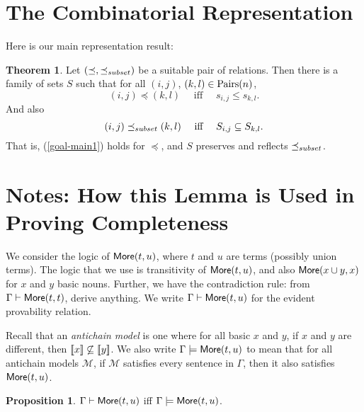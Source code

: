 \documentclass[12pt]{article}
\theoremstyle{definition}
\newtheorem{theorem}{Theorem}
\newtheorem{proposition}{Proposition}
\newcommand{\semantics}[1]{[\![\mbox{\em $ #1 $\/}]\!]}
\newcommand{\Model}{\mathcal{M}}
\newcommand{\proves}{\vdash}
\newcommand{\quadiff}{\quad \mbox{ iff } \quad}
\begin{document}
\section{The Combinatorial Representation}
Here is our main representation result:

\begin{theorem}
Let $(\preceq, \preceq_{\scriptsize subset})$ be a suitable pair of relations.
Then there is a family of sets $S$
such that for all $(i,j)$, $(k,l)\in\mbox{Pairs}(n)$,
\begin{equation}
    \label{goal-main1}
 (i,j) \preceq  (k,l) \quadiff 
 s_{i,j}\leq s_{k,l}.
 \end{equation}
 And also
 \begin{equation}
    \label{goal-main2}
 (i,j) \precsubseteq  (k,l) \quadiff 
S_{i,j}\subseteq S_{k,l}.
 \end{equation}
 That is, (\ref{goal-main1}) holds for $\preceq$, and $S$ preserves and reflects $\preceq_{\scriptsize subset}$.
 \label{theorem-thoughts-subset}
 \end{theorem}
 
 
\section{Notes: How this Lemma is Used in Proving Completeness}

\newcommand{\more}{\mbox{\sf More}}

We consider the logic of $\more(t,u)$, where $t$ and $u$ are terms (possibly union terms).
The logic that we use is transitivity of $\more(t,u)$, and also $\more(x\cup y, x)$ for $x$ and $y$
basic nouns.  Further, we have the contradiction rule:
from $\Gamma\proves\more(t,t)$, derive anything.
We write $\Gamma\proves\more(t,u)$
for the evident provability relation.  

Recall that an \emph{antichain model} is one where for all basic $x$ and $y$, if $x$ and $y$ are different,
then $\semantics{x} \not\subseteq \semantics{y}$.
We also write $\Gamma\models\more(t,u)$
to mean that for all {antichain models} $\Model$, if $\Model$ satisfies every sentence in $\Gamma$,
then it also satisfies $\more(t,u)$.

\begin{proposition}
$\Gamma\proves \more(t,u)$ iff $\Gamma\models\more(t,u)$.
\end{proposition}
\end{document}
